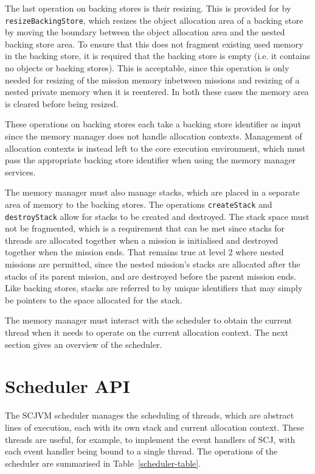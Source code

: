 The last operation on backing stores is their resizing.
This is provided for by \texttt{resize\-Backing\-Store}, which resizes
the object allocation area of a backing store by moving the boundary
between the object allocation area and the nested backing store area.
To ensure that this does not fragment existing used memory in the
backing store, it is required that the backing store is empty (i.e. 
it contains no objects or backing stores).
This is acceptable, since this operation is only needed for resizing
of the mission memory inbetween missions and resizing of a nested
private memory when it is reentered.
In both these cases the memory area is cleared before being resized.

These operations on backing stores each take a backing store
identifier as input since the memory manager does not handle
allocation contexts.
Management of allocation contexts is instead left to the core
execution environment, which must pass the appropriate backing store
identifier when using the memory manager services.

The memory manager must also manage stacks, which are placed in a
separate area of memory to the backing stores.
The operations \texttt{create\-Stack} and \texttt{destroy\-Stack}
allow for stacks to be created and destroyed.
The stack space must not be fragmented, which is a requirement that
can be met since stacks for threads are allocated together when a
mission is initialised and destroyed together when the mission ends.
That remains true at level 2 where nested missions are permitted,
since the nested mission's stacks are allocated after the stacks of
its parent mission, and are destroyed before the parent mission ends.
Like backing stores, stacks are referred to by unique identifiers that
may simply be pointers to the space allocated for the stack.

The memory manager must interact with the scheduler to obtain the
current thread when it needs to operate on the current allocation
context.
The next section gives an overview of the scheduler.

\section{Scheduler API}
\label{scheduler-section}

The SCJVM scheduler manages the scheduling of threads, which are
abstract lines of execution, each with its own stack and current
allocation context.
These threads are useful, for example, to implement the event handlers
of SCJ, with each event handler being bound to a single thread.
The operations of the scheduler are summarised in
Table~\ref{scheduler-table}.

